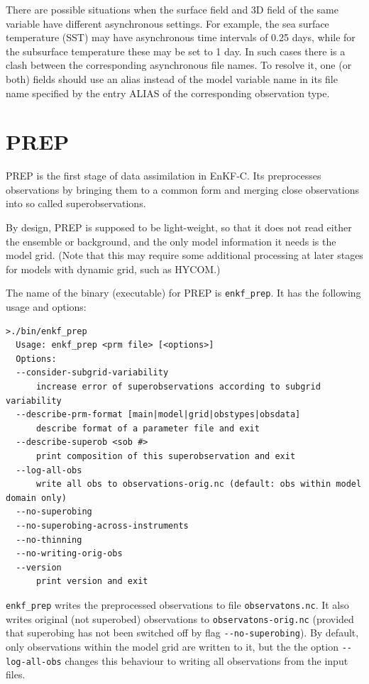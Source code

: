 \documentclass[11pt]{report}
\begin{document}
There are possible situations when the surface field and 3D field of the same variable have different asynchronous settings.
For example, the sea surface temperature (SST) may have asynchronous time intervals of 0.25 days, while for the subsurface temperature these may be set to 1 day.
In such cases there is a clash between the corresponding asynchronous file names.
To resolve it, one (or both) fields should use an alias instead of the model variable name in its file name specified by the entry ALIAS of the corresponding observation type.

\section{PREP}

PREP is the first stage of data assimilation in EnKF-C.
Its preprocesses observations by bringing them to a common form and merging close observations into so called superobservations.

By design, PREP is supposed to be light-weight, so that it does not read either the ensemble or background, and the only model information it needs is the model grid. 
(Note that this may require some additional processing at later stages for models with dynamic grid, such as HYCOM.)

The name of the binary (executable) for PREP is \verb|enkf_prep|.
It has the following usage and options:
\begin{Verbatim}[frame=single,fontsize=\footnotesize]
>./bin/enkf_prep
  Usage: enkf_prep <prm file> [<options>]
  Options:
  --consider-subgrid-variability
      increase error of superobservations according to subgrid variability
  --describe-prm-format [main|model|grid|obstypes|obsdata]
      describe format of a parameter file and exit
  --describe-superob <sob #>
      print composition of this superobservation and exit
  --log-all-obs
      write all obs to observations-orig.nc (default: obs within model domain only)
  --no-superobing
  --no-superobing-across-instruments
  --no-thinning
  --no-writing-orig-obs
  --version
      print version and exit
\end{Verbatim}

\verb|enkf_prep| writes the preprocessed observations to file \verb|observatons.nc|.
It also writes original (not superobed) observations to \verb|observatons-orig.nc| (provided that superobing has not been switched off by flag \verb|--no-superobing|).
By default, only observations within the model grid are written to it, but the the option \verb|--log-all-obs| changes this behaviour to writing all observations from the input files.
\end{document}
